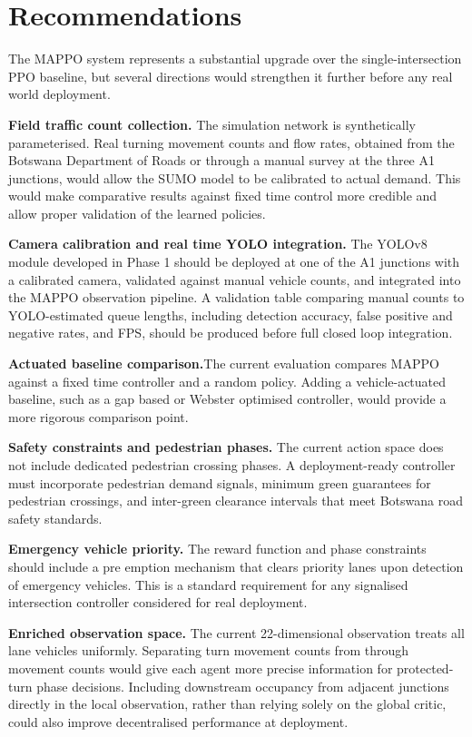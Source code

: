 ﻿\documentclass[11pt, a4paper]{report}
\begin{document}
\chapter{Recommendations}

The MAPPO system represents a substantial upgrade over the single-intersection PPO baseline, but several directions would strengthen it further before any real world deployment.

\textbf{Field traffic count collection.}  The simulation network is synthetically
  parameterised. Real turning movement counts and flow rates, obtained from the
  Botswana Department of Roads or through a manual survey at the three A1
  junctions, would allow the SUMO model to be calibrated to actual demand. This
  would make comparative results against fixed time control more credible and
  allow proper validation of the learned policies.

\textbf{Camera calibration and real time YOLO integration.}  The YOLOv8 module developed
  in Phase 1 should be deployed at one of the A1 junctions with a calibrated
  camera, validated against manual vehicle counts, and integrated into the MAPPO
  observation pipeline. A validation table comparing manual counts to
  YOLO-estimated queue lengths, including detection accuracy, false positive and
  negative rates, and FPS, should be produced before full closed loop integration.

\textbf{Actuated baseline comparison.}The current evaluation compares MAPPO against a
  fixed time controller and a random policy. Adding a vehicle-actuated baseline,
  such as a gap based or Webster optimised controller, would provide a more
  rigorous comparison point.

\textbf{Safety constraints and pedestrian phases.} The current action space does not include dedicated pedestrian crossing phases. A deployment-ready controller must incorporate pedestrian demand signals, minimum green guarantees for pedestrian crossings, and inter-green clearance intervals that meet Botswana road safety standards.

\textbf{Emergency vehicle priority.} The reward function and phase constraints should include a pre emption mechanism that clears priority lanes upon detection of emergency vehicles. This is a standard requirement for any signalised intersection controller considered for real deployment.

\textbf{Enriched observation space.} The current 22-dimensional observation treats all lane vehicles uniformly. Separating turn movement counts from through movement counts would give each agent more precise information for protected-turn phase decisions. Including downstream occupancy from adjacent junctions directly in the local observation, rather than relying solely on the global critic, could also improve decentralised performance at deployment.
\end{document}
